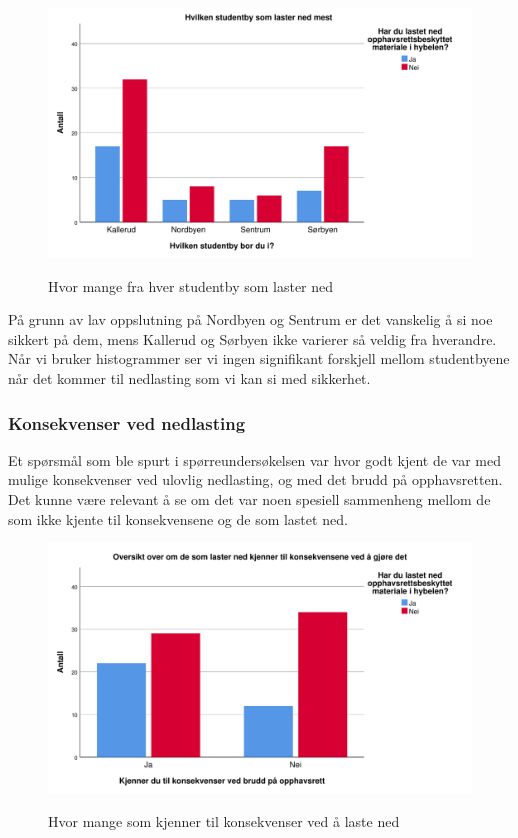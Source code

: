 \begin{figure}[H]
    \centering
    \includegraphics[scale=0.45]{case_1/bilder/studentby_lasterned.pdf}
    \label{fig:studentby_lasterned}
    \caption[Studentby laster ned]{Hvor mange fra hver studentby som laster ned}
\end{figure}

På grunn av lav oppslutning på Nordbyen og Sentrum er det vanskelig å si noe sikkert på dem, mens Kallerud og Sørbyen ikke varierer så veldig fra hverandre. Når vi bruker histogrammer ser vi ingen signifikant forskjell mellom studentbyene når det kommer til nedlasting som vi kan si med sikkerhet.

\subsubsection{Konsekvenser ved nedlasting}
Et spørsmål som ble spurt i spørreundersøkelsen var hvor godt kjent de var med mulige konsekvenser ved ulovlig nedlasting, og med det brudd på opphavsretten. Det kunne være relevant å se om det var noen spesiell sammenheng mellom de som ikke kjente til konsekvensene og de som lastet ned. 

\begin{figure}[H]
    \centering
    \includegraphics[scale=0.45]{case_1/bilder/konsekvens_lasterned.pdf}
    \label{fig:konsekvens_lasterned}
    \caption[Konsekvens av å laste ned]{Hvor mange som kjenner til konsekvenser ved å laste ned}
\end{figure}

